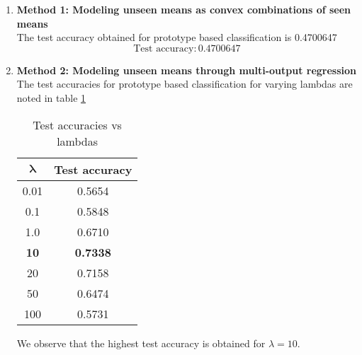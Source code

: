 \documentclass[a4paper,11pt]{article}
\begin{document}
\begin{mlsolution}

\begin{enumerate}
	\item \textbf{Method 1: Modeling unseen means as convex combinations of seen means}
	\\ The test accuracy obtained for prototype based classification is  0.4700647
	\[
	\boxed{\text{Test accuracy}:0.4700647 }
	\]
	\item \textbf{Method 2: Modeling unseen means through multi-output regression}\\
	The test accuracies for prototype based classification for varying lambdas are noted in table \ref{acc}
	\begin{table}[!htb]
		\label{acc}
		\centering
		\begin{tabular}{|c|c|}
			\hline
			 \rowcolor{gray!25} \hspace{2mm} $\mathbf{\lambda}$ \hspace{2mm} & \textbf{Test accuracy} \\
			\hline
			0.01 & 0.5654\\
			\hline
			0.1 & 0.5848\\
			\hline
			1.0 & 0.6710\\
			\hline
			\textbf{10} & \textbf{0.7338}\\
			\hline
			20 & 0.7158\\
			\hline
			50 & 0.6474\\
			\hline
			100 &  0.5731 \\
			\hline
		\end{tabular}
	\caption{Test accuracies vs lambdas}
	\end{table}
We observe that the highest test accuracy is obtained for $\lambda = 10$.
\end{enumerate}

\end{mlsolution}
\end{document}
